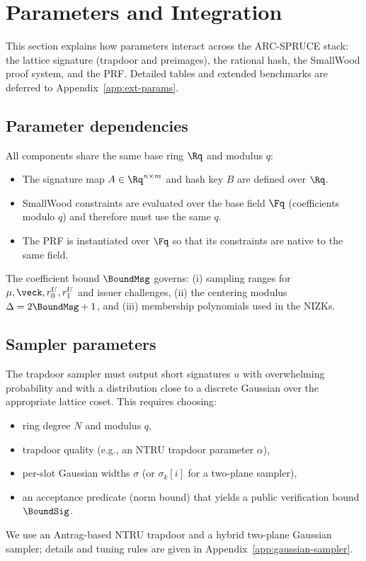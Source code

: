 \section{Parameters and Integration}
\label{sec:parameters}

This section explains how parameters interact across the ARC-SPRUCE stack: the lattice signature (trapdoor and
preimages), the rational hash, the SmallWood proof system, and the PRF. Detailed tables and extended benchmarks are
deferred to Appendix~\ref{app:ext-params}.

\subsection{Parameter dependencies}
All components share the same base ring \(\Rq\) and modulus \(q\):
\begin{itemize}[leftmargin=1.25em]
  \item The signature map \(A\in\Rq^{n\times m}\) and hash key \(B\) are defined over \(\Rq\).
  \item SmallWood constraints are evaluated over the base field \(\Fq\) (coefficients modulo \(q\)) and therefore must
  use the same \(q\).
  \item The PRF is instantiated over \(\Fq\) so that its constraints are native to the same field.
\end{itemize}
The coefficient bound \(\BoundMsg\) governs:
(i) sampling ranges for \(\mu,\veck,r_0^U,r_1^U\) and issuer challenges,
(ii) the centering modulus \(\Delta=2\BoundMsg+1\), and
(iii) membership polynomials used in the NIZKs.

\subsection{Sampler parameters}
The trapdoor sampler must output short signatures \(u\) with overwhelming probability and with a distribution close to
a discrete Gaussian over the appropriate lattice coset. This requires choosing:
\begin{itemize}[leftmargin=1.25em]
  \item ring degree \(N\) and modulus \(q\),
  \item trapdoor quality (e.g., an NTRU trapdoor parameter \(\alpha\)),
  \item per-slot Gaussian widths \(\sigma\) (or \(\sigma_k[i]\) for a two-plane sampler),
  \item an acceptance predicate (norm bound) that yields a public verification bound \(\BoundSig\).
\end{itemize}
We use an Antrag-based NTRU trapdoor and a hybrid two-plane Gaussian sampler; details and tuning rules are given in
Appendix~\ref{app:gaussian-sampler}.


